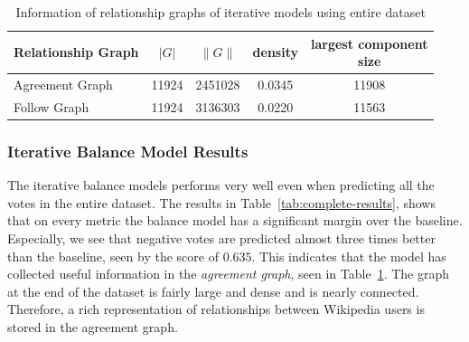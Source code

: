 \begin{table}[htp]
    \centering
    \caption{Information of relationship graphs of iterative models using entire \wikirfa dataset}
    \label{tab:iterative-graphs}
    \begin{tabular}{lcccc}
        \toprule
        Relationship Graph & $|G|$ & $\|G\|$ & density & \shortstack{largest component \\size}\\
        \midrule
        
        Agreement Graph& 11924 &2451028 & 0.0345 & 11908\\
        
        Follow Graph & 11924 & 3136303 & 0.0220 & 11563 \\


        \bottomrule
        \end{tabular}
\end{table}

\subsubsection{Iterative Balance Model Results}
The iterative balance models performs very well even when predicting all the votes in the entire \wikirfa dataset.
The results in Table~\ref{tab:complete-results}, shows that on every metric the balance model has a significant margin over the baseline.
Especially, we see that negative votes are predicted almost three times better than the baseline, seen by the \aucnegPR score of $0.635$.
This indicates that the model has collected useful information in the \textit{agreement graph}, seen in Table~\ref{tab:iterative-graphs}.
The graph at the end of the dataset is fairly large and dense and is nearly connected.
Therefore, a rich representation of relationships between Wikipedia users is stored in the agreement graph.


